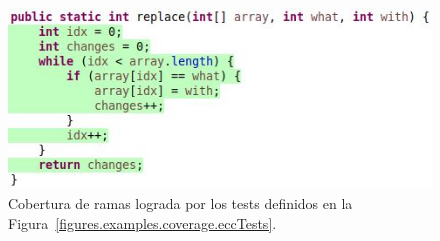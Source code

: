 \begin{figure}
	\centering
	\includegraphics[width=\linewidth]{figures/replaceFullCoverage.JPG}
	\caption[Cobertura de ramas para los tests de la Figura~\ref{figures.examples.coverage.eccTests}]{Cobertura de ramas lograda por los tests definidos en la Figura~\ref{figures.examples.coverage.eccTests}.}
	\label{figures.examples.coverage.eccCoverage}
\end{figure}
